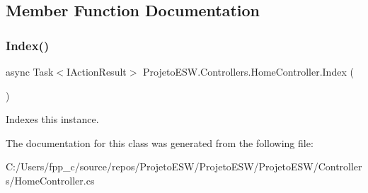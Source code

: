 \subsection{Member Function Documentation}
\mbox{\label{class_projeto_e_s_w_1_1_controllers_1_1_home_controller_a706bb4cc2b5f04f7436c6114fd1e2fe4}} 
\subsubsection{\texorpdfstring{Index()}{Index()}}
{\footnotesize\ttfamily async Task$<$I\+Action\+Result$>$ Projeto\+E\+S\+W.\+Controllers.\+Home\+Controller.\+Index (\begin{DoxyParamCaption}{ }\end{DoxyParamCaption})}



Indexes this instance.



The documentation for this class was generated from the following file\+:\begin{DoxyCompactItemize}
\item 
C\+:/\+Users/fpp\+\_\+c/source/repos/\+Projeto\+E\+S\+W/\+Projeto\+E\+S\+W/\+Projeto\+E\+S\+W/\+Controllers/Home\+Controller.\+cs\end{DoxyCompactItemize}
